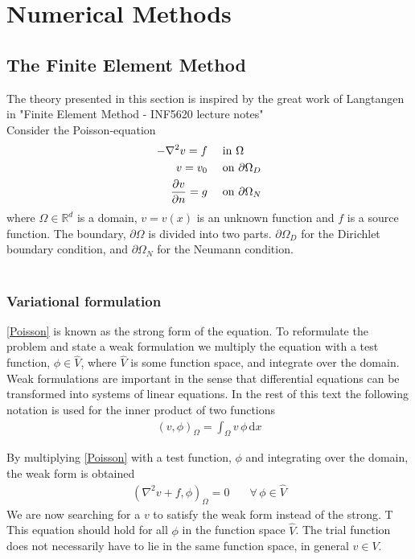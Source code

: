 \chapter{Numerical Methods}
\section{The Finite Element Method}
The theory presented in this section is inspired by the great work of Langtangen in "Finite Element Method - INF5620 lecture notes" \cite{Lang2}  \\
Consider the Poisson-equation
\begin{align}
-\nabla^2 v = f & \quad \text{ in } \Omega \label{Poisson}\\
v = v_0 & \quad \text{ on } \partial \label{Poisson_D}\Omega_D \\
\frac{\partial v}{\partial n} = g & \quad \text{ on } \partial \Omega_N \label{Poisson_N}
\end{align}
where $\Omega \in \mathbb{R}^d$ is a domain, $ v = v(x)$ is an unknown function and $f$ is a source function. The boundary, $\partial \Omega$ is divided into two parts. $\partial \Omega_D$ for the Dirichlet boundary condition, and $\partial \Omega_N$ for the Neumann condition. 
\\
\\
\subsection{Variational formulation}
\eqref{Poisson} is known as the strong form of the equation. To reformulate the problem and state a weak formulation we multiply the equation with a test function, $\phi \in \hat{V}$, where $\hat{V}$ is some function space, and integrate over the domain. Weak formulations are important in the sense that differential equations can be transformed into systems of linear equations. In the rest of this text the following notation is used for the inner product of two functions
\begin{align} (v,\phi)_{\Omega} = \int_{\Omega} v \, \phi \, \mathrm{d}x
\end{align}

By multiplying \eqref{Poisson} with a test function, $\phi$ and integrating over the domain, the weak form is obtained
\begin{align}
(\nabla^2 v + f, \phi)_\Omega = 0 & \quad \forall \, \phi \in\hat{V} \label{Projection}
\end{align}
We are now searching for a $v$ to satisfy the weak form instead of the strong. T
This equation should hold for all $\phi$ in the function space $\hat{V}$. The trial function does not necessarily have to lie in the same function space, in general $v \in V$. \\

